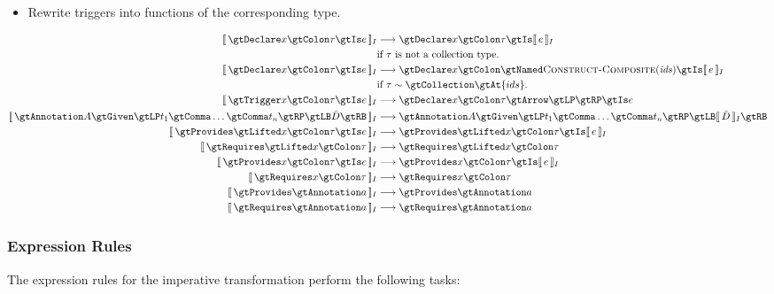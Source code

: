 \documentclass{article}
\begin{document}
    \begin{itemize}
        \item Rewrite triggers into functions of the corresponding type.
    \end{itemize}
%
    \begin{adjustwidth}{-0.5in}{-0.5in}\begin{align*}
        \eqI{\gtDeclare x \gtColon \tau \gtIs e}
            {\gtDeclare x \gtColon \tau \gtIs \intI{e}}
            {if $\tau$ is not a collection type.} \\
        \eqI{\gtDeclare x \gtColon \tau \gtIs e}
            {\gtDeclare x \gtColon \gtNamed \ConstructComposite{ids} \gtIs \intI{e}}
            {if $\tau \sim \gtCollection \gtAt \{ids\}$.} \\
        \eqI{\gtTrigger x \gtColon \tau \gtIs e}
            {\gtDeclare x \gtColon \tau \gtArrow \gtLP \gtRP \gtIs e}
            {} \\
        \eqI{\gtAnnotation A \gtGiven \gtLP t_1 \gtComma \ldots \gtComma t_n \gtRP \gtLB \bar{D} \gtRB}
            {\gtAnnotation A \gtGiven \gtLP t_1 \gtComma \ldots \gtComma t_n \gtRP \gtLB \intI{\bar{D}} \gtRB}{} \\
        \eqI{\gtProvides \gtLifted x \gtColon \tau \gtIs e}
            {\gtProvides \gtLifted x \gtColon \tau \gtIs \intI{e}}{} \\
        \eqI{\gtRequires \gtLifted x \gtColon \tau}
            {\gtRequires \gtLifted x \gtColon \tau}{} \\
        \eqI{\gtProvides x \gtColon \tau \gtIs e}
            {\gtProvides x \gtColon \tau \gtIs \intI{e}}{} \\
        \eqI{\gtRequires x \gtColon \tau}
            {\gtRequires x \gtColon \tau}{} \\
        \eqI{\gtProvides \gtAnnotation a}
            {\gtProvides \gtAnnotation a}{} \\
        \eqI{\gtRequires \gtAnnotation a}
            {\gtRequires \gtAnnotation a}{}
    \end{align*}\end{adjustwidth}

    \subsubsection{Expression Rules}

    The expression rules for the imperative transformation perform the following tasks:
\end{document}
